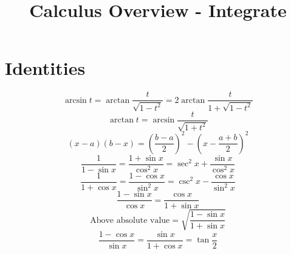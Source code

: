 \documentclass{overview}
\title{Calculus Overview - Integrate}
\begin{document}
\maketitle

\section{Identities}
\begin{equation}
	\arcsin t = \arctan \frac{t}{\sqrt{1-t^2}} = 2 \arctan \frac{t}{1+\sqrt{1-t^2}}
	\label{eq:ArcSinToArcTanByHalfAngle}
\end{equation}
\begin{equation}
	\arctan t = \arcsin \frac{t}{\sqrt{1+t^2}} 
\end{equation}
\begin{equation}
	 (x-a)(b-x) = \left(\frac{b-a}{2}\right)^2 - \left(x-\frac{a+b}{2}\right)^2
	 \label{eq:XMinusAXMinusB}
\end{equation}
\begin{equation}
	\frac{1}{1-\sin x} = \frac{1+\sin x}{\cos^2 x} =
	\sec^2 x + \frac{\sin x}{\cos^2 x}
\end{equation}
\begin{equation}
	\frac{1}{1+\cos x} = \frac{1-\cos x}{\sin^2 x} =
	\csc^2 x - \frac{\cos x}{\sin^2 x}
\end{equation}
\begin{equation}
	\frac{1-\sin x}{\cos x} = \frac{\cos x}{1+\sin x} 
\end{equation}
\[
	\text{Above absolute value} = \sqrt{\frac{1-\sin x}{1+\sin x}}
\] 
\begin{equation}
	\frac{1-\cos x}{\sin x} = \frac{\sin x}{1+\cos x}= \tan \frac{x}{2}
\end{equation}
\end{document}

